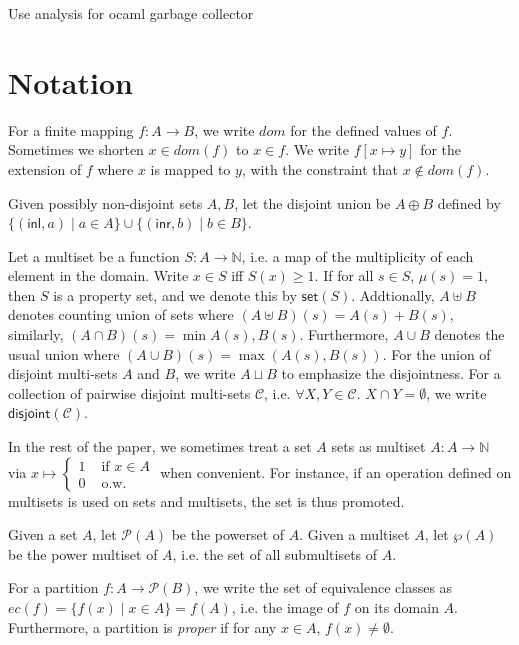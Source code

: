 \documentclass{easychair}
\newcommand{\ms}[1]{\ensuremath{\mathsf{#1}}}
\newcommand{\dist}[1]{\mathsf{disjoint}(#1)}
\newcommand{\jan}[1]{{\color{red} #1}}
\theoremstyle{definition}
\begin{document}
\jan{Use analysis for ocaml garbage collector}
\newpage
\label{sect:bib}

%
%
%


\appendix

\section{Notation}
\label{sect:notation}
For a finite mapping $f : A \to B$, we write $dom$ for the defined values of $f$. Sometimes we shorten $x \in dom(f)$ to $x \in f$. We write $f[x \mapsto y]$ for the extension of $f$ where $x$ is mapped to $y$, with the constraint that $x \notin dom(f)$. 

Given possibly non-disjoint sets $A,B$, let the disjoint union be $A \oplus B$ defined by 
$\{(\ms{inl},a) \mid a \in A\} \cup \{(\ms{inr},b) \mid b \in B\}$.

Let a multiset be a function $S : A \to \mathbb{N}$, i.e. a map of the multiplicity of each element in the domain.  Write $x \in S$ iff $S(x) \ge 1$. If for all  $s \in S$, $\mu(s) = 1$, then $S$ 
is a property set, and we denote this by $\ms{set}(S)$. Addtionally, $A \uplus B$ denotes 
counting union of sets where $(A \uplus B) (s) = A (s) + B(s)$, similarly, 
$(A \cap B)(s) = \min{A(s),B(s)}$. Furthermore, $A \cup B$ denotes the usual union where 
$(A \cup B)(s) = \max{(A(s),B(s))}$.  For the union of disjoint multi-sets $A$ and $B$, 
we write $A \sqcup B$ to emphasize the disjointness.  For a collection of pairwise disjoint 
multi-sets $\mathcal{C}$, i.e. $\forall X,Y \in \mathcal{C}$. $X \cap Y = \emptyset$, we write $\dist{\mathcal{C}}$.

In the rest of the paper, 
we sometimes treat a set $A$ sets as multiset $A : A \to \mathbb{N}$ via 
$x \mapsto \begin{cases} 1 &\text{ if } x \in A \\0 &\text{ o.w.}\end{cases}$ when convenient. 
For instance, if an operation defined on multisets is used on sets and multisets, the set 
is thus promoted.

Given a set $A$, let $\mathcal{P}(A)$ be the powerset of $A$. Given a multiset $A$, let 
$\wp(A)$ be the power multiset of $A$, i.e. the set of all submultisets of $A$.

For a partition $f : A \to \mathcal{P}(B)$, we write the set of equivalence classes
as $ec(f) = \{f(x) \mid x \in A\} = f(A)$, i.e. the image of $f$ on its domain $A$.
Furthermore, a partition is \emph{proper} if for any $x \in A$, $f(x) \neq \emptyset$.
\end{document}
